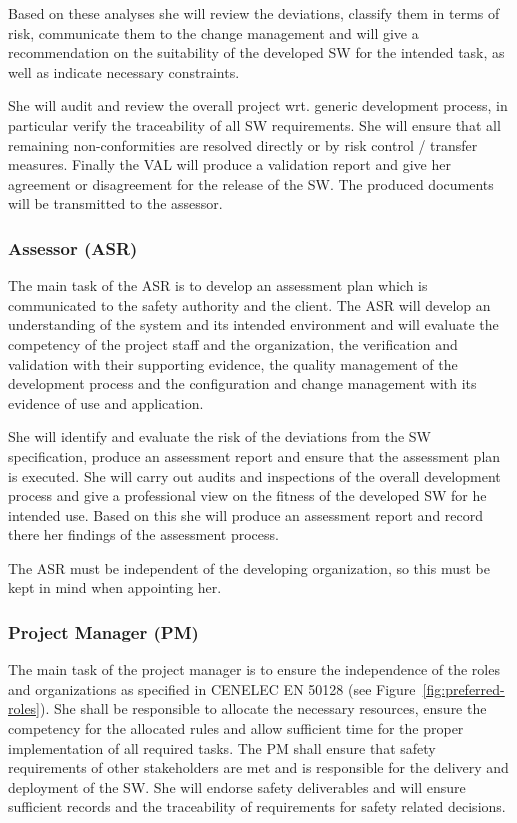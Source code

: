 Based on these analyses she will review the deviations, classify them in terms
of risk, communicate them to the change management and will give a
recommendation on the suitability of the developed SW for the intended task, as
well as indicate necessary constraints.

She will audit and review the overall project wrt. generic development process,
in particular verify the traceability of all SW requirements. She will ensure
that all remaining non-conformities are resolved directly or by risk control /
transfer measures. Finally the VAL will produce a validation report and give her
agreement or disagreement for the release of the SW. The produced documents will
be transmitted to the assessor.

\subsubsection{Assessor (ASR)}
\label{sec:assessor}

The main task of the ASR is to develop an assessment plan which is communicated
to the safety authority and the client. The ASR will develop an understanding of
the system and its intended environment and will evaluate the competency of the
project staff and the organization, the verification and validation with their
supporting evidence, the quality management of the development process and the
configuration and change management with its evidence of use and application.

She will identify and evaluate the risk of the deviations from the SW
specification, produce an assessment report and ensure that the assessment plan
is executed. She will carry out audits and inspections of the overall
development process and give a professional view on the fitness of the developed
SW for he intended use. Based on this she will produce an assessment report and
record there her findings of the assessment process.

The ASR must be independent of the developing organization, so this must be kept
in mind when appointing her.

\subsubsection{Project Manager (PM)}
\label{sec:project-manager}

The main task of the project manager is to ensure the independence of the roles
and organizations as specified in CENELEC EN 50128 (see
Figure~\ref{fig:preferred-roles}). She shall be responsible to allocate the
necessary resources, ensure the competency for the allocated rules and allow
sufficient time for the proper implementation of all required tasks. The PM
shall ensure that safety requirements of other stakeholders are met and is
responsible for the delivery and deployment of the SW. She will endorse safety
deliverables and will ensure sufficient records and the traceability of
requirements for safety related decisions.

